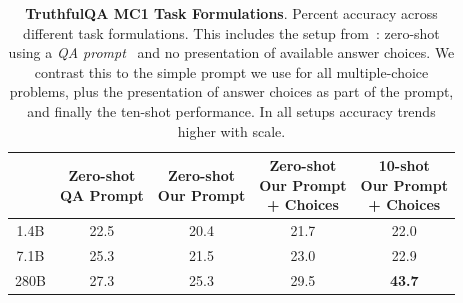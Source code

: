 \documentclass[11pt, a4paper, logo, internal, copyright, nonumbering]{deepmind}
\begin{document}
\begin{table}[ht]
    \centering
    \begin{tabular}{c c c c c}
    \toprule
                & \shortstack{Zero-shot \newline QA Prompt \newline} & \shortstack{Zero-shot \newline Our Prompt \newline} & \shortstack{Zero-shot \newline Our Prompt \newline + Choices} & \shortstack{10-shot \newline Our Prompt \newline + Choices} \\
                \midrule
       1.4B     & 22.5  & 20.4  & 21.7  & 22.0 \\
       7.1B     & 25.3  & 21.5  & 23.0  & 22.9 \\
       280B     & 27.3  & 25.3  & 29.5  & \textbf{43.7} \\
       \bottomrule
    \end{tabular}
    \caption{\textbf{TruthfulQA MC1 Task Formulations}. Percent accuracy across different task formulations. This includes the setup from~\citet{truthfulqa}: zero-shot using a \textit{QA prompt}~\citep{qa_prompt} and no presentation of available answer choices. We contrast this to the simple prompt we use for all multiple-choice problems, plus the presentation of answer choices as part of the prompt, and finally the ten-shot performance. In all setups accuracy trends higher with scale.}
    \label{tab:truthfulqa_ablations}
\end{table}
\end{document}
